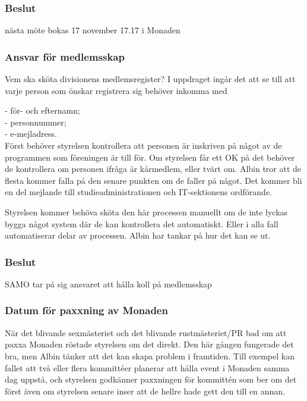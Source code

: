 \documentclass[protokoll]{dvd}
\begin{document}
\subsubsection*{Beslut}
\begin{attsatser}
    \item nästa möte bokas 17 november 17.17 i Monaden 
\end{attsatser}

\subsubsection{Ansvar för medlemsskap}

Vem ska sköta divisionens medlemsregister? I uppdraget ingår det att se till att varje person som önskar registrera sig behöver inkomma med

- för- och efternamn; \\
- personnummer; \\
- e-mejladress. \\

Först behöver styrelsen kontrollera att personen är inskriven på något av de programmen som föreningen är till för. Om styrelsen får ett OK på det behöver de kontrollera om personen ifråga är kårmedlem, eller tvärt om. Albin tror att de flesta kommer falla på den senare punkten om de faller på något. Det kommer bli en del mejlande till studieadministrationen och IT-sektionens ordförande.

Styrelsen kommer behöva sköta den här processen manuellt om de inte lyckas bygga något system där de kan kontrollera det automatiskt. Eller i alla fall automatiserar delar av processen. Albin har tankar på hur det kan se ut.


\subsubsection*{Beslut}

\begin{attsatser}
    \item SAMO tar på sig ansvaret att hålla koll på medlemsskap
\end{attsatser}




\subsubsection{Datum för paxxning av Monaden}

När det blivande sexmästeriet och det blivande rustmästeriet/PR bad om att paxxa Monaden röstade styrelsen om det direkt. Den här gången fungerade det bra, men Albin tänker att det kan skapa problem i framtiden. Till exempel kan fallet att två eller flera kommittéer planerar att hålla event i Monaden samma dag uppstå, och styrelsen godkänner paxxningen för kommittén som ber om det först även om styrelsen senare inser att de hellre hade gett den till en annan.
\end{document}
